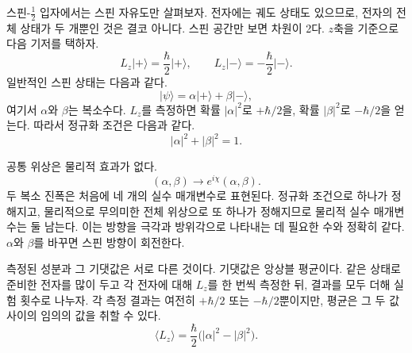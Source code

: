 스핀-\(\tfrac12\) 입자에서는 스핀 자유도만 살펴보자. 전자에는 궤도 상태도 있으므로, 전자의 전체 상태가 두 개뿐인 것은 결코 아니다. 스핀 공간만 보면 차원이 2다. \(z\)축을 기준으로 다음 기저를 택하자.
\begin{equation}
L_z\lvert+\rangle=\frac{\hbar}{2}\lvert+\rangle,
\qquad
L_z\lvert-\rangle=-\frac{\hbar}{2}\lvert-\rangle.
\end{equation}
일반적인 스핀 상태는 다음과 같다.
\begin{equation}
\lvert\psi\rangle
=
\alpha\lvert+\rangle+\beta\lvert-\rangle,
\end{equation}
여기서 \(\alpha\)와 \(\beta\)는 복소수다. \(L_z\)를 측정하면 확률 \(|\alpha|^2\)로 \(+\hbar/2\)을, 확률 \(|\beta|^2\)로 \(-\hbar/2\)을 얻는다. 따라서 정규화 조건은 다음과 같다.
\begin{equation}
|\alpha|^2+|\beta|^2=1.
\end{equation}

공통 위상은 물리적 효과가 없다.
\begin{equation}
(\alpha,\beta)\longrightarrow
e^{i\chi}(\alpha,\beta).
\end{equation}
두 복소 진폭은 처음에 네 개의 실수 매개변수로 표현된다. 정규화 조건으로 하나가 정해지고, 물리적으로 무의미한 전체 위상으로 또 하나가 정해지므로 물리적 실수 매개변수는 둘 남는다. 이는 방향을 극각과 방위각으로 나타내는 데 필요한 수와 정확히 같다. \(\alpha\)와 \(\beta\)를 바꾸면 스핀 방향이 회전한다.

측정된 성분과 그 기댓값은 서로 다른 것이다. 기댓값은 앙상블 평균이다. 같은 상태로 준비한 전자를 많이 두고 각 전자에 대해 \(L_z\)를 한 번씩 측정한 뒤, 결과를 모두 더해 실험 횟수로 나누자. 각 측정 결과는 여전히 \(+\hbar/2\) 또는 \(-\hbar/2\)뿐이지만, 평균은 그 두 값 사이의 임의의 값을 취할 수 있다.
\begin{equation}
\langle L_z\rangle
=
\frac{\hbar}{2}\bigl(|\alpha|^2-|\beta|^2\bigr).
\end{equation}

